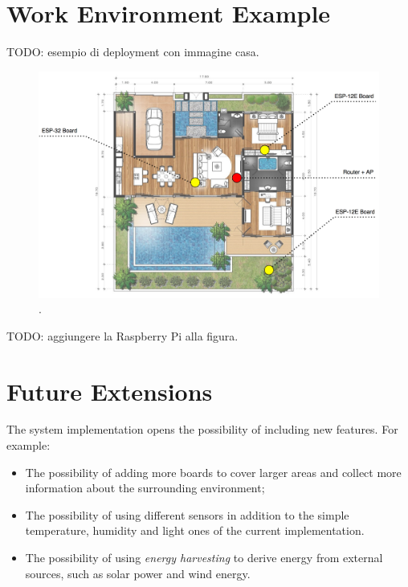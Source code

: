 \section{Work Environment Example}
TODO: esempio di deployment con immagine casa.

\begin{figure}[H]
	\begin{center}
		\includegraphics[width=\textwidth]{./pictures/blueprint_deployment.png}
		\caption{.}
		\label{blueprint_deployment}
	\end{center}
\end{figure}

TODO: aggiungere la Raspberry Pi alla figura.

\section{Future Extensions}
The system implementation opens the possibility of including new features. For example:

\begin{itemize}
	\item The possibility of adding more boards to cover larger areas and collect more information about the surrounding environment;
	\item The possibility of using different sensors in addition to the simple temperature, humidity and light ones of the current implementation.
	\item The possibility of using \textit{energy harvesting} to derive energy from external sources, such as solar power and wind energy.
\end{itemize}